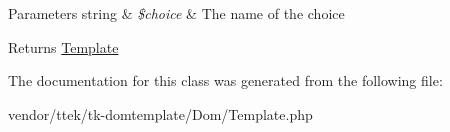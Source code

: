 \begin{DoxyParams}[1]{Parameters}
string & {\em \$choice} & The name of the choice \\
\hline
\end{DoxyParams}
\begin{DoxyReturn}{Returns}
\hyperlink{classDom_1_1Template}{Template} 
\end{DoxyReturn}


The documentation for this class was generated from the following file\+:\begin{DoxyCompactItemize}
\item 
vendor/ttek/tk-\/domtemplate/\+Dom/Template.\+php\end{DoxyCompactItemize}

